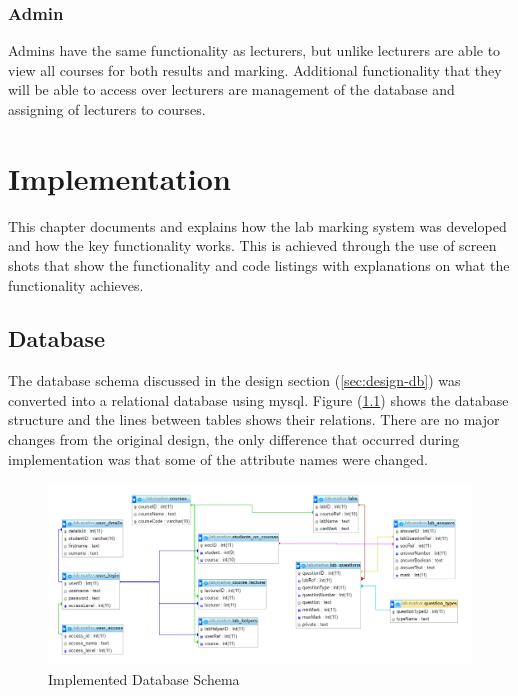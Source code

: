 \documentclass[11pt]{report}
\begin{document}
\subsection*{Admin}

Admins have the same functionality as lecturers, but unlike lecturers are able to view all courses for both results and marking. Additional functionality that they will be able to access over lecturers are management of the database and assigning of lecturers to courses.




\newpage
\chapter{Implementation}
This chapter documents and explains how the lab marking system was developed and how the key functionality works. This is achieved through the use of screen shots that show the functionality and code listings with explanations on what the functionality achieves.   

\section{Database}

The database schema discussed in the design section (\ref{sec:design-db}) was converted into a relational database using mysql. Figure (\ref{fig:implement-db}) shows the database structure and the lines between tables shows their relations. There are no major changes from the original design, the only difference that occurred during implementation was that some of the attribute names were changed.  

\begin{figure}[H]
    \centering
    \includegraphics[width=1\textwidth]{images/implementation/database.png}
    \caption{Implemented Database Schema}
    \label{fig:implement-db}
\end{figure}
\end{document}
